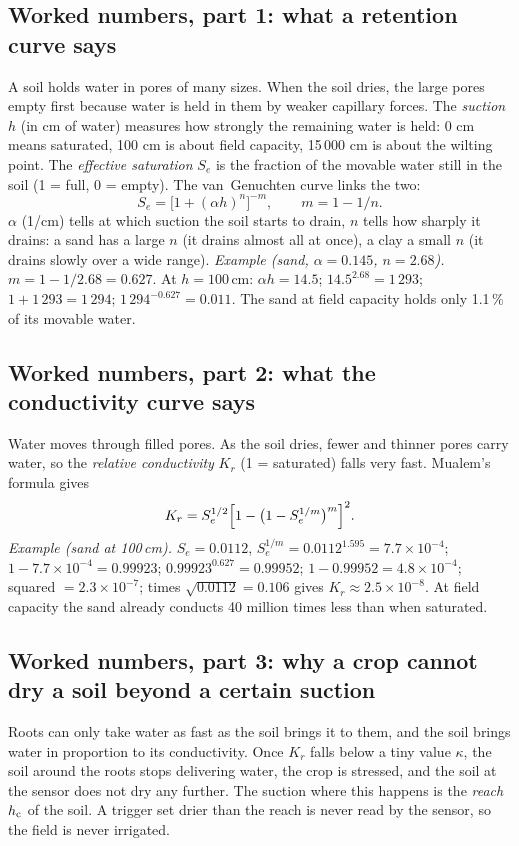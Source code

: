 \subsection{Worked numbers, part 1: what a retention curve says}
A soil holds water in pores of many sizes. When the soil dries, the large pores empty first because water is held in them by weaker capillary forces. The \emph{suction} $h$ (in cm of water) measures how strongly the remaining water is held: 0 cm means saturated, 100 cm is about field capacity, 15\,000 cm is about the wilting point. The \emph{effective saturation} $S_e$ is the fraction of the movable water still in the soil (1 = full, 0 = empty). The van~Genuchten curve links the two:
\[S_e=\bigl[1+(\alpha h)^n\bigr]^{-m},\qquad m=1-1/n .\]
$\alpha$ (1/cm) tells at which suction the soil starts to drain, $n$ tells how sharply it drains: a sand has a large $n$ (it drains almost all at once), a clay a small $n$ (it drains slowly over a wide range).
\emph{Example (sand, $\alpha=0.145$, $n=2.68$).} $m=1-1/2.68=0.627$. At $h=100$\,cm: $\alpha h=14.5$; $14.5^{2.68}=1\,293$; $1+1\,293=1\,294$; $1\,294^{-0.627}=0.011$. The sand at field capacity holds only 1.1\,\% of its movable water.


\subsection{Worked numbers, part 2: what the conductivity curve says}
Water moves through filled pores. As the soil dries, fewer and thinner pores carry water, so the \emph{relative conductivity} $K_r$ (1 = saturated) falls very fast. Mualem's formula gives
\[K_r=S_e^{1/2}\Bigl[1-\bigl(1-S_e^{1/m}\bigr)^{m}\Bigr]^{2}.\]
\emph{Example (sand at 100\,cm).} $S_e=0.0112$, $S_e^{1/m}=0.0112^{1.595}=7.7\times10^{-4}$; $1-7.7\times10^{-4}=0.99923$; $0.99923^{0.627}=0.99952$; $1-0.99952=4.8\times10^{-4}$; squared $=2.3\times10^{-7}$; times $\sqrt{0.0112}=0.106$ gives $K_r\approx2.5\times10^{-8}$. At field capacity the sand already conducts 40 million times less than when saturated.


\subsection{Worked numbers, part 3: why a crop cannot dry a soil beyond a certain suction}
Roots can only take water as fast as the soil brings it to them, and the soil brings water in proportion to its conductivity. Once $K_r$ falls below a tiny value $\kappa$, the soil around the roots stops delivering water, the crop is stressed, and the soil at the sensor does not dry any further. The suction where this happens is the \emph{reach} $h_{\mathrm{c}}$ of the soil. A trigger set drier than the reach is never read by the sensor, so the field is never irrigated.



